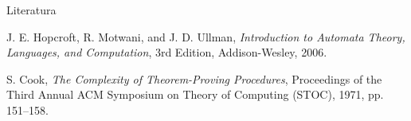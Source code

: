 \documentclass[aspectratio=169, xcolor=table, 10pt]{beamer}
\theoremstyle{definition}
\begin{document}
\begin{frame}{Literatura}
    \begin{thebibliography}{9}
    
    J. E. Hopcroft, R. Motwani, and J. D. Ullman, 
    \textit{Introduction to Automata Theory, Languages, and Computation}, 
    3rd Edition, Addison-Wesley, 2006.
    
    S. Cook, 
    \textit{The Complexity of Theorem-Proving Procedures}, 
    Proceedings of the Third Annual ACM Symposium on Theory of Computing (STOC), 1971, pp. 151–158.
    
    \end{thebibliography}
\end{frame}
    
\end{document}

